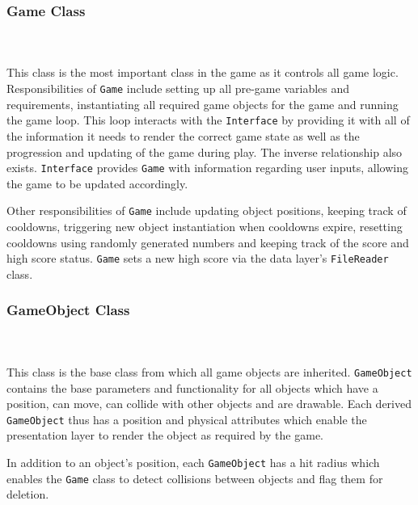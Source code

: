 \documentclass[10pt,twocolumn]{witseiepaper}
\begin{document}
\subsubsection{Game Class}
~\\
~\\
This class is the most important class in the game as it controls all game logic. Responsibilities of \texttt{Game} include setting up all pre-game variables and requirements, instantiating all required game objects for the game and running the game loop. This loop interacts with the \texttt{Interface} by providing it with all of the information it needs to render the correct game state as well as the progression and updating of the game during play. The inverse relationship also exists. \texttt{Interface} provides \texttt{Game} with information regarding user inputs, allowing the game to be updated accordingly. 

Other responsibilities of \texttt{Game} include updating object positions, keeping track of cooldowns, triggering new object instantiation when cooldowns expire, resetting cooldowns using randomly generated numbers and keeping track of the score and high score status. \texttt{Game} sets a new high score via the data layer's \texttt{FileReader} class. 


\subsubsection{GameObject Class}
~\\
~\\
 This class is the base class from which all game objects are inherited. \texttt{GameObject} contains the base parameters and functionality for all objects which have a position, can move, can collide with other objects and are drawable. Each derived \texttt{GameObject} thus has a position and physical attributes which enable the presentation layer to render the object as required by the game.
 
 In addition to an object's position, each \texttt{GameObject} has a hit radius which enables the \texttt{Game} class to detect collisions between objects and flag them for deletion. 
 
\end{document}
